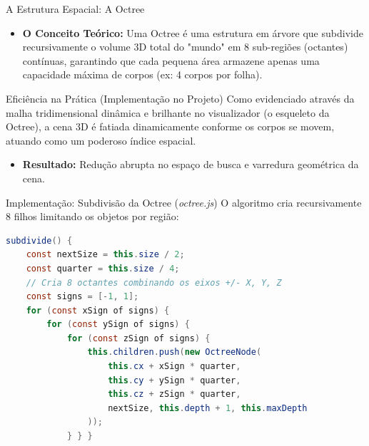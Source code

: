 \documentclass[10pt, aspectratio=169]{beamer}
\begin{document}
\begin{frame}{A Estrutura Espacial: A Octree}
    \begin{itemize}
        \item \textbf{O Conceito Teórico:} Uma Octree é uma estrutura em árvore que subdivide recursivamente o volume 3D total do "mundo" em 8 sub-regiões (octantes) contínuas, garantindo que cada pequena área armazene apenas uma capacidade máxima de corpos (ex: 4 corpos por folha).
    \end{itemize}
    
    \begin{block}{Eficiência na Prática (Implementação no Projeto)}
        Como evidenciado através da malha tridimensional dinâmica e brilhante no visualizador (o esqueleto da Octree), a cena 3D é fatiada dinamicamente conforme os corpos se movem, atuando como um poderoso índice espacial.
    \end{block}

    \begin{itemize}
        \item \textbf{Resultado:} Redução abrupta no espaço de busca e varredura geométrica da cena.
    \end{itemize}
\end{frame}

\begin{frame}[fragile]{Implementação: Subdivisão da Octree (\textit{octree.js})}
    O algoritmo cria recursivamente 8 filhos limitando os objetos por região:
\begin{lstlisting}[language=Java]
subdivide() {
    const nextSize = this.size / 2;
    const quarter = this.size / 4;
    // Cria 8 octantes combinando os eixos +/- X, Y, Z
    const signs = [-1, 1];
    for (const xSign of signs) {
        for (const ySign of signs) {
            for (const zSign of signs) {
                this.children.push(new OctreeNode(
                    this.cx + xSign * quarter,
                    this.cy + ySign * quarter,
                    this.cz + zSign * quarter,
                    nextSize, this.depth + 1, this.maxDepth
                ));
            } } }
\end{lstlisting}
\end{frame}
\end{document}
